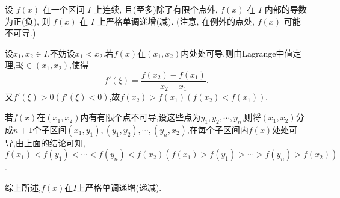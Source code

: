 



\begin{exercise}[3.3.16]\label{ex:3.3.16}
    设 $f(x)$ 在一个区间 $I$ 上连续, 且(至多)除了有限个点外, $f(x)$ 在 $I$ 内部的导数为正(负), 则 $f(x)$ 在 $I$ 上严格单调递增(减). (注意, 在例外的点处, $f(x)$ 可能不可导.)
\end{exercise}

\begin{solution}
    设$x_1,x_2 \in I$,不妨设$x_1 < x_2$.若$f(x)$在$(x_1,x_2)$内处处可导,则由Lagrange中值定理,$\exists \xi \in (x_1,x_2)$,使得
    $$
        f'(\xi) = \frac{f(x_2)-f(x_1)}{x_2-x_1}.
    $$
    又$f'(\xi) > 0 (f'(\xi) < 0)$,故$f(x_2) > f(x_1) (f(x_2) < f(x_1))$.

    若$f(x)$在$(x_1,x_2)$内有有限个点不可导,设这些点为$y_1,y_2,\cdots,y_n$,则将$(x_1,x_2)$分成$n+1$个子区间$(x_1,y_1),(y_1,y_2),\cdots,(y_n,x_2)$,在每个子区间内$f(x)$处处可导,由上面的结论可知,$f(x_1)<f(y_1)<\cdots<f(y_n)<f(x_2)\left(f(x_1)>f(y_1)>\cdots>f(y_n)>f(x_2)\right)$.
    
    综上所述,$f(x)$在$I$上严格单调递增(递减).
\end{solution}

